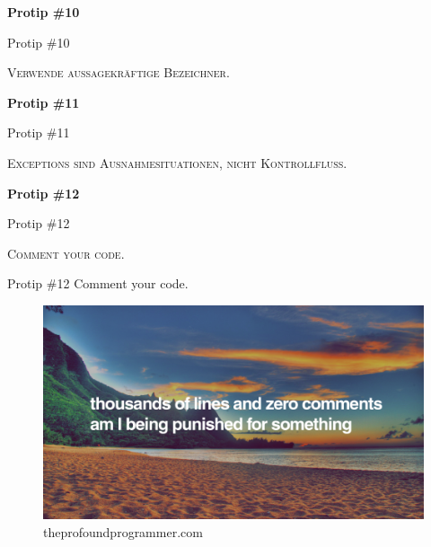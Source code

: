 \documentclass[18pt]{beamer}
\begin{document}
\begin{frame}{\quad}
    \center
    \Huge{\textbf{Protip \#10}}
\end{frame}

\begin{frame}{Protip \#10}
    \begin{block}{}
        \center
        \textsc{Verwende aussagekräftige Bezeichner.}
    \end{block}
\end{frame}

\begin{frame}{\quad}
    \center
    \Huge{\textbf{Protip \#11}}
\end{frame}

\begin{frame}{Protip \#11}
    \begin{block}{}
        \center
        \textsc{Exceptions sind Ausnahmesituationen, nicht Kontrollfluss.}
    \end{block}
\end{frame}

\begin{frame}{\quad}
    \center
    \Huge{\textbf{Protip \#12}}
\end{frame}

\begin{frame}{Protip \#12}
    \begin{block}{}
        \center
        \textsc{Comment your code.}
    \end{block}
\end{frame}

\begin{frame}{Protip \#12 Comment your code.}
    \begin{figure}
        \includegraphics[scale=.6]{img/zerocomments.png}
        \caption{\footnotesize{theprofoundprogrammer.com}}
    \end{figure}
\end{frame}
\end{document}
